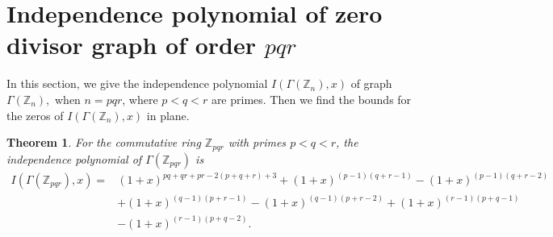 \documentclass[12pt,twoside]{article}
\newtheorem{theorem}{Theorem}[section]
\begin{document}
\section{Independence polynomial of zero divisor graph of order $pqr$}\label{section 4}
In this section, we give the independence polynomial $I(\varGamma(\mathbb{Z}_{n}),x)$ of graph $\varGamma(\mathbb{Z}_{n}),$ when $n=pqr$, where $p<q<r$ are primes. Then we find the bounds for the zeros of $I(\varGamma(\mathbb{Z}_{n}),x)$ in plane.
\begin{theorem}\label{in poly of zpqr}
	For the commutative ring $ \mathbb{Z}_{pqr}$ with primes $p<q<r$, the independence polynomial of $\varGamma(\mathbb{Z}_{pqr})$ is
	\begin{align*}
		I(\varGamma(\mathbb{Z}_{pqr}),x)=& (1+x)^{pq+qr+pr-2(p+q+r)+3} + (1+x)^{(p-1)(q+r-1)} - (1+x)^{(p-1)(q+r-2)}\\
		& + (1+x)^{(q-1)(p+r-1)} - (1+x)^{(q-1)(p+r-2)} + (1+x)^{(r-1)(p+q-1)}\\
		&- (1+x)^{(r-1)(p+q-2)}.
	\end{align*}
\end{theorem}
\end{document}
